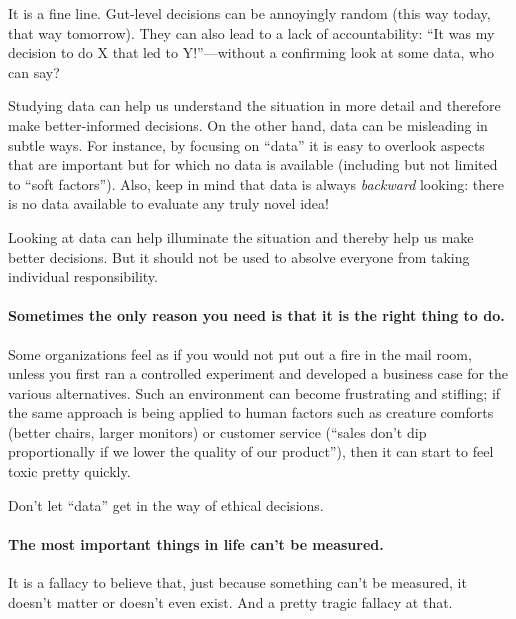 It is a fine line. Gut-level decisions can be annoyingly random (this
way today, that way tomorrow). They can also lead to a lack of
accountability: ``It was my decision to do X that led to
Y!''---without a confirming look at some data, who can say?

Studying data can help us understand the situation in more detail and
therefore make better-informed decisions. On the other hand, data can
be misleading in subtle ways. For instance, by focusing on ``data'' it
is easy to overlook aspects that are important but for which no data
is available (including but not limited to ``soft factors''). Also,
keep in mind that data is always \emph{backward} looking: there is no
data available to evaluate any truly novel idea!

Looking at data can help illuminate the situation and thereby help us
make better decisions. But it should not be used to absolve everyone
from taking individual responsibility.


\paragraph{Sometimes the only reason you need is that it is the right
thing to do.} Some organizations feel as if you would not
put out a fire in the mail room, unless you first ran a controlled
experiment and developed a business case for the various alternatives.
Such an environment can become frustrating and stifling; if the same
approach is being applied to human factors such as creature comforts
(better chairs, larger monitors) or customer service (``sales don't dip
proportionally if we lower the quality of our product''), then it can
start to feel toxic pretty quickly.

Don't let ``data'' get in the way of ethical decisions.  


\paragraph{The most important things in life can't be
measured.}  It is a fallacy to believe that, just because
something can't be measured, it doesn't matter or doesn't even exist. 
And a pretty tragic fallacy at that.


\clearpage

\thispagestyle{empty}

\cleardoublepage